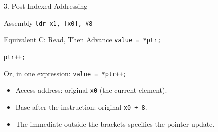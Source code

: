 \documentclass[aspectratio=169,11pt,t]{beamer}
\newcommand{\code}[1]{\texttt{#1}}
\begin{document}



\begin{frame}{3. Post-Indexed Addressing}
\begin{block}{Assembly}
\code{ldr x1, [x0], \#8}
\end{block}
\begin{block}{Equivalent C: Read, Then Advance}
\code{value = *ptr;}\par
\code{ptr++;}\par
Or, in one expression: \code{value = *ptr++;}
\end{block}
\begin{itemize}
\item Access address: original \code{x0} (the current element).
\item Base after the instruction: original \code{x0 + 8}.
\item The immediate outside the brackets specifies the pointer update.
\end{itemize}
\end{frame}



\end{document}
